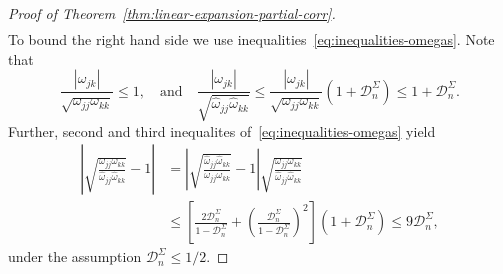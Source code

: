 \documentclass[11pt]{article}
\begin{document}
\begin{appendices}
\begin{proof}[Proof of Theorem~\ref{thm:linear-expansion-partial-corr}]
\begin{align*}
\end{align*}
To bound the right hand side we use inequalities~\eqref{eq:inequalities-omegas}. Note that
\[
\frac{|\omega_{jk}|}{\sqrt{\omega_{jj}\omega_{kk}}} \le 1,\quad\mbox{and}\quad \frac{|\omega_{jk}|}{\sqrt{\widehat{\omega}_{jj}\widehat{\omega}_{kk}}}  \leq \frac{|\omega_{jk}|}{\sqrt{\omega_{jj}\omega_{kk}}} (1 + \mathcal{D}_n^{\Sigma}) 
\leq 1 + \mathcal{D}_n^{\Sigma}.
\]
Further, second and third inequalites of~\eqref{eq:inequalities-omegas} yield
\begin{align*}
\left|\sqrt{\frac{\omega_{jj}\omega_{kk}}{\widehat{\omega}_{jj}\widehat{\omega}_{kk}}} - 1\right| &= \left|\sqrt{\frac{\widehat{\omega}_{jj}\widehat{\omega}_{kk}}{\omega_{jj}\omega_{kk}}} - 1\right|\sqrt{\frac{\omega_{jj}\omega_{kk}}{\widehat{\omega}_{jj}\widehat{\omega}_{kk}}}\\
&\le \left[\frac{2\mathcal{D}_n^{\Sigma}}{1 - \mathcal{D}_n^{\Sigma}} + \left(\frac{\mathcal{D}_n^{\Sigma}}{1 - \mathcal{D}_n^{\Sigma}}\right)^2\right](1 + \mathcal{D}_n^{\Sigma}) \le 9\mathcal{D}_n^{\Sigma},
\end{align*}
under the assumption $\mathcal{D}_n^{\Sigma} \le 1/2$.


\end{proof}
\end{appendices}
\end{document}
